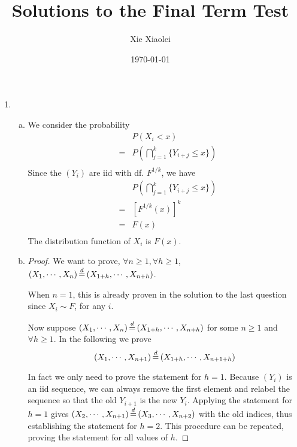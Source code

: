 \documentclass{report}
\author{Xie Xiaolei}
\date{\today}
\title{Solutions to the Final Term Test}
\begin{document}
\maketitle

\begin{enumerate}[1.]
\item
  \begin{enumerate}[(a)]
  \item We consider the probability
    \begin{eqnarray*}
      && P(X_i < x) \\
      &=& P(\bigcap_{j=1}^k \{Y_{i+j} \le x\}) \\
    \end{eqnarray*}
    Since the $(Y_i)$ are iid with df. $F^{1/k}$, we have
    \begin{eqnarray*}
      && P(\bigcap_{j=1}^k \{Y_{i+j} \le x\}) \\
      &=& [F^{1/k}(x)]^k \\
      &=& F(x) \\
    \end{eqnarray*}
    The distribution function of $X_i$ is $F(x)$.

  \item 
    \begin{proof}
      We want to prove, $\forall n \ge 1, \forall h \ge 1$, $(X_1,
      \cdots, X_n) \ed (X_{1+h}, \cdots, X_{n+h})$.

      When $n = 1$, this is already proven in the solution to the last
      question since $X_i \sim F$, for any $i$.

      Now suppose $(X_1, \cdots, X_n) \ed (X_{1+h}, \cdots, X_{n+h})$
      for some $n \ge 1$ and $\forall h \ge 1$. In the following we
      prove 
      \[
      (X_1, \cdots, X_{n+1}) \ed (X_{1+h}, \cdots, X_{n+1+h})
      \]
      
      In fact we only need to prove the statement for $h=1$. Because
      $(Y_i)$ is an iid sequence, we can always remove the first element
      and relabel the sequence so that the old $Y_{i+1}$ is the new
      $Y_{i}$. Applying the statement for $h=1$ gives $(X_2, \cdots,
      X_{n+1}) \ed (X_{3}, \cdots, X_{n+2})$ with the old indices,
      thus establishing the statement for $h=2$. This procedure can be
      repeated, proving the statement for all values of $h$.


\end{proof}
\end{enumerate}
\end{enumerate}
\end{document}

